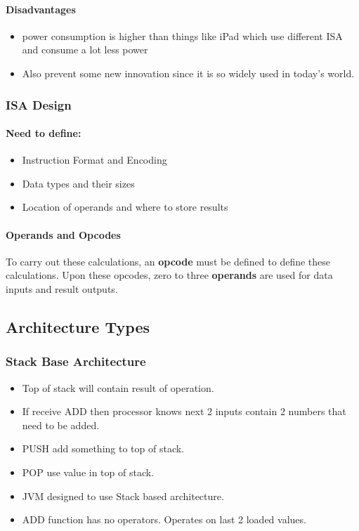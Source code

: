 \documentclass{article}
\newcommand\tab[1][0.5cm]{\hspace*{#1}}
\begin{document}
			\paragraph{\tab Disadvantages}
				\begin{itemize}
					\item power consumption is higher than things like iPad which use different ISA and consume a lot less power
					\item Also prevent some new innovation since it is so widely used in today's world.
				\end{itemize}


		\subsubsection{ISA Design}
			\paragraph{\tab Need to define:}
			\begin{itemize}
				\item Instruction Format and Encoding
				\item Data types and their sizes
				\item Location of operands and where to store results
			\end{itemize}

		\paragraph{\tab Operands and Opcodes} To carry out these calculations, an \textbf{opcode} must be defined to define these calculations. Upon these opcodes, zero to three \textbf{operands} are used for data inputs and result outputs.

	\subsection{Architecture Types}
		\subsubsection{Stack Base Architecture}
			\begin{itemize}
				\item Top of stack will contain result of operation.
				\item If receive ADD then processor knows next 2 inputs contain 2 numbers that need to be added.
				\item PUSH add something to top of stack.
				\item POP use value in top of stack.
				\item JVM designed to use Stack based architecture.
				\item ADD function has no operators. Operates on last 2 loaded values.
			\end{itemize}
\end{document}
